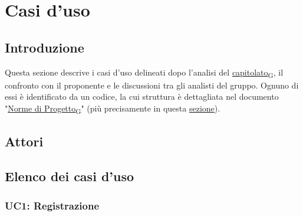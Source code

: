 \section{Casi d'uso}
\subsection{Introduzione}
Questa sezione descrive i casi d'uso delineati dopo l'analisi del \href{https://7last.github.io/docs/rtb/documentazione-interna/glossario#capitolato}{capitolato\textsubscript{G}}, il confronto con il proponente e le discussioni tra gli analisti del gruppo. Ognuno di essi è identificato da un codice, la cui struttura è dettagliata nel documento "\href{https://7last.github.io/docs/rtb/documentazione-interna/glossario#norme-di-progetto}{Norme di Progetto\textsubscript{G}}" (più precisamente in questa \href{www.google.com}{sezione}).

\subsection{Attori}

\subsection{Elenco dei casi d'uso}
\subsubsection{UC1: Registrazione}
